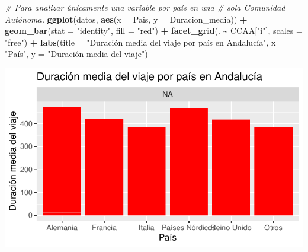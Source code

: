 \documentclass[data,article,submit,moreauthors,pdftex]{Definitions/mdpi}
\newenvironment{Shaded}{\begin{snugshade}}{\end{snugshade}}
\newcommand{\AttributeTok}[1]{\textcolor[rgb]{0.13,0.29,0.53}{#1}}
\newcommand{\CommentTok}[1]{\textcolor[rgb]{0.56,0.35,0.01}{\textit{#1}}}
\newcommand{\FunctionTok}[1]{\textcolor[rgb]{0.13,0.29,0.53}{\textbf{#1}}}
\newcommand{\NormalTok}[1]{#1}
\newcommand{\SpecialCharTok}[1]{\textcolor[rgb]{0.81,0.36,0.00}{\textbf{#1}}}
\newcommand{\StringTok}[1]{\textcolor[rgb]{0.31,0.60,0.02}{#1}}
\begin{document}
\begin{Shaded}
\begin{Highlighting}[]
\CommentTok{\# Para analizar únicamente una variable por país en una}
\CommentTok{\# sola Comunidad Autónoma.}
\FunctionTok{ggplot}\NormalTok{(datos, }\FunctionTok{aes}\NormalTok{(}\AttributeTok{x =}\NormalTok{ Pais, }\AttributeTok{y =}\NormalTok{ Duracion\_media)) }\SpecialCharTok{+} \FunctionTok{geom\_bar}\NormalTok{(}\AttributeTok{stat =} \StringTok{"identity"}\NormalTok{,}
    \AttributeTok{fill =} \StringTok{"red"}\NormalTok{) }\SpecialCharTok{+} \FunctionTok{facet\_grid}\NormalTok{(. }\SpecialCharTok{\textasciitilde{}}\NormalTok{ CCAA[}\StringTok{"i"}\NormalTok{], }\AttributeTok{scales =} \StringTok{"free"}\NormalTok{) }\SpecialCharTok{+}
    \FunctionTok{labs}\NormalTok{(}\AttributeTok{title =} \StringTok{"Duración media del viaje por país en Andalucía"}\NormalTok{,}
        \AttributeTok{x =} \StringTok{"País"}\NormalTok{, }\AttributeTok{y =} \StringTok{"Duración media del viaje"}\NormalTok{)}
\end{Highlighting}
\end{Shaded}

\includegraphics{ProyectoAED2024_Rmd_files/figure-latex/unnamed-chunk-29-3.pdf}
\end{document}
